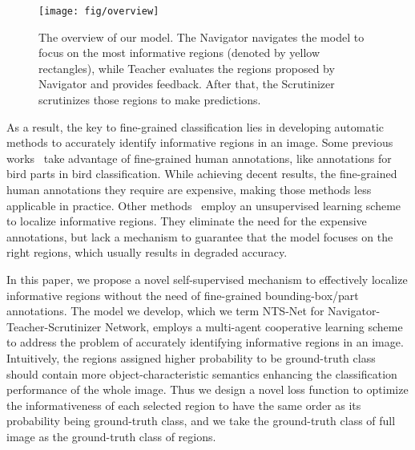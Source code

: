\documentclass[runningheads]{llncs}
\begin{document}
\begin{figure}[ht]
\begin{center}
\texttt{[image: fig/overview]}
\end{center}
   \caption{The overview of our model.  The Navigator navigates the model to focus on the most informative regions (denoted by yellow rectangles), while Teacher evaluates the regions proposed by Navigator and provides feedback. After that, the Scrutinizer scrutinizes those regions to make predictions.}
\label{overview}
\end{figure}

As a result, the key to fine-grained classification lies in developing automatic methods to accurately identify informative regions in an image. Some previous works~\cite{Xie2013Hierarchical,Chai2013Symbiotic,BransonVBP14,ZhangECCV14,Gavves2014Fine,Berg:2013:PPO:2514950.2516271,Liu2012Dog} take advantage of fine-grained human annotations, like annotations for bird parts in bird classification.  While achieving decent results, the fine-grained human annotations they require are expensive, making those methods less applicable in practice. Other methods~\cite{Zheng_2017_ICCV,Zhang_2016_CVPR,Zhao:2017:DVA:3101467.3101537,Wang2015Multiple} employ an unsupervised learning scheme to localize informative regions. They eliminate the need for the expensive annotations, but lack a mechanism to guarantee that the model focuses on the right regions, which usually results in degraded accuracy.

In this paper, we propose a novel self-supervised mechanism to effectively localize informative regions without the need of fine-grained bounding-box/part annotations.  The model we develop, which we term NTS-Net for Navigator-Teacher-Scrutinizer Network, employs a multi-agent cooperative learning scheme to address the problem of accurately identifying informative regions in an image.  Intuitively, the regions assigned higher probability to be ground-truth class should contain more object-characteristic semantics enhancing the classification performance of the whole image. Thus we design a novel loss function to optimize the informativeness of each selected region to have the same order as its probability being ground-truth class, and we take the ground-truth class of full image as the ground-truth class of regions. 
\end{document}
